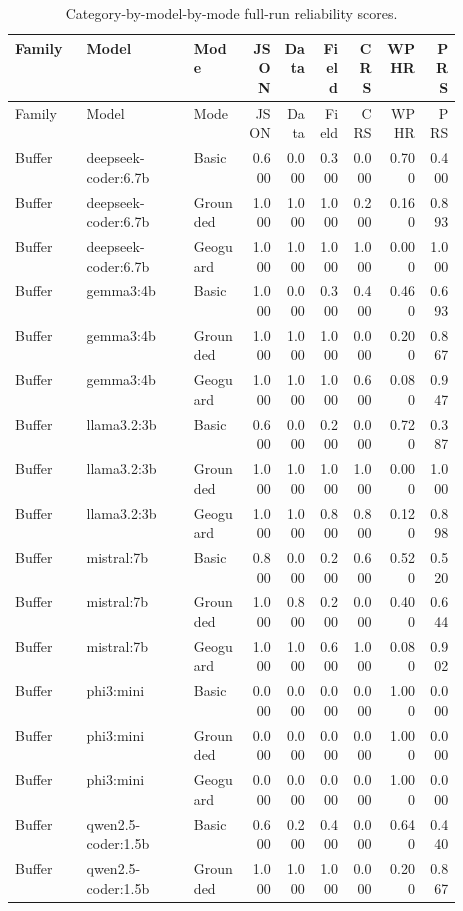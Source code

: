 \begin{longtable}{p{0.16\linewidth}p{0.24\linewidth}p{0.12\linewidth}rrrrrr}
\caption{Category-by-model-by-mode full-run reliability scores.}\label{tab:category-model-mode-long}\\
\toprule
Family & Model & Mode & JSON & Data & Field & CRS & WPHR & PRS \\
\midrule
\endfirsthead
\toprule
Family & Model & Mode & JSON & Data & Field & CRS & WPHR & PRS \\
\midrule
\endhead
Buffer & deepseek-coder:6.7b & Basic & 0.600 & 0.000 & 0.300 & 0.000 & 0.700 & 0.400 \\
Buffer & deepseek-coder:6.7b & Grounded & 1.000 & 1.000 & 1.000 & 0.200 & 0.160 & 0.893 \\
Buffer & deepseek-coder:6.7b & Geoguard & 1.000 & 1.000 & 1.000 & 1.000 & 0.000 & 1.000 \\
Buffer & gemma3:4b & Basic & 1.000 & 0.000 & 0.300 & 0.400 & 0.460 & 0.693 \\
Buffer & gemma3:4b & Grounded & 1.000 & 1.000 & 1.000 & 0.000 & 0.200 & 0.867 \\
Buffer & gemma3:4b & Geoguard & 1.000 & 1.000 & 1.000 & 0.600 & 0.080 & 0.947 \\
Buffer & llama3.2:3b & Basic & 0.600 & 0.000 & 0.200 & 0.000 & 0.720 & 0.387 \\
Buffer & llama3.2:3b & Grounded & 1.000 & 1.000 & 1.000 & 1.000 & 0.000 & 1.000 \\
Buffer & llama3.2:3b & Geoguard & 1.000 & 1.000 & 0.800 & 0.800 & 0.120 & 0.898 \\
Buffer & mistral:7b & Basic & 0.800 & 0.000 & 0.200 & 0.600 & 0.520 & 0.520 \\
Buffer & mistral:7b & Grounded & 1.000 & 0.800 & 0.200 & 0.000 & 0.400 & 0.644 \\
Buffer & mistral:7b & Geoguard & 1.000 & 1.000 & 0.600 & 1.000 & 0.080 & 0.902 \\
Buffer & phi3:mini & Basic & 0.000 & 0.000 & 0.000 & 0.000 & 1.000 & 0.000 \\
Buffer & phi3:mini & Grounded & 0.000 & 0.000 & 0.000 & 0.000 & 1.000 & 0.000 \\
Buffer & phi3:mini & Geoguard & 0.000 & 0.000 & 0.000 & 0.000 & 1.000 & 0.000 \\
Buffer & qwen2.5-coder:1.5b & Basic & 0.600 & 0.200 & 0.400 & 0.000 & 0.640 & 0.440 \\
Buffer & qwen2.5-coder:1.5b & Grounded & 1.000 & 1.000 & 1.000 & 0.000 & 0.200 & 0.867 \\

\end{longtable}
